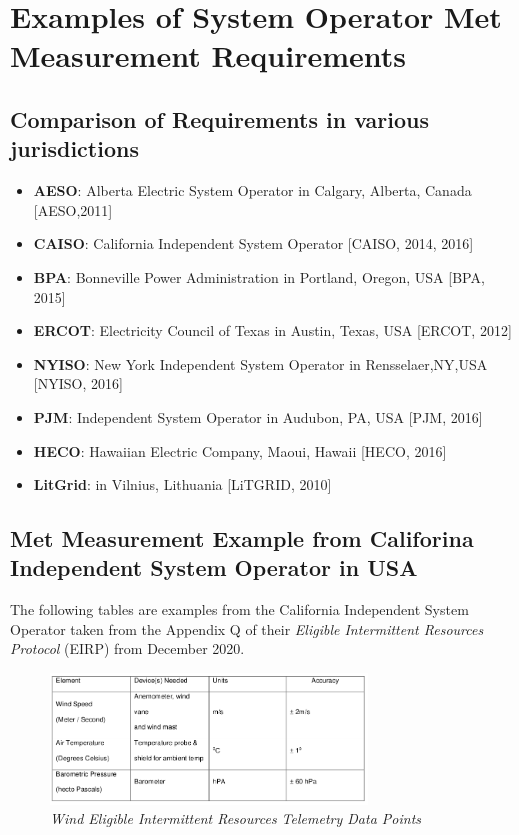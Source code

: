 \chapter{Examples of System Operator Met Measurement Requirements}\label{ch:requiremenexamples}


\section{Comparison of Requirements in various jurisdictions}

\begin{itemize}
    \item \textbf{AESO}: Alberta Electric System Operator in Calgary, Alberta, Canada [AESO,2011]
    \item \textbf{CAISO}: California Independent System Operator [CAISO, 2014, 2016]
    \item \textbf{BPA}: Bonneville Power Administration in Portland, Oregon, USA [BPA, 2015]
    \item \textbf{ERCOT}: Electricity Council of Texas in Austin, Texas, USA [ERCOT, 2012]
    \item \textbf{NYISO}: New York Independent System Operator in Rensselaer,NY,USA [NYISO, 2016] 
    \item \textbf{PJM}: Independent System Operator in Audubon, PA, USA [PJM, 2016]
    \item \textbf{HECO}: Hawaiian Electric Company, Maoui, Hawaii [HECO, 2016]
    \item \textbf{LitGrid}: in Vilnius, Lithuania [LiTGRID, 2010]
\end{itemize}


\section{Met Measurement Example from Califorina Independent System Operator in USA}

The following tables are examples from the California Independent System Operator taken from the Appendix Q of their \textit{Eligible Intermittent Resources Protocol} (EIRP) from December 2020. 

\begin{figure}[h!]
\includegraphics[width=0.75\textwidth]{figures/CAISO_tableQ1.png}
\caption{\textit{Wind Eligible Intermittent Resources Telemetry Data Points}} 
\label{fig:CAISO_tableQ1}
\end{figure}

